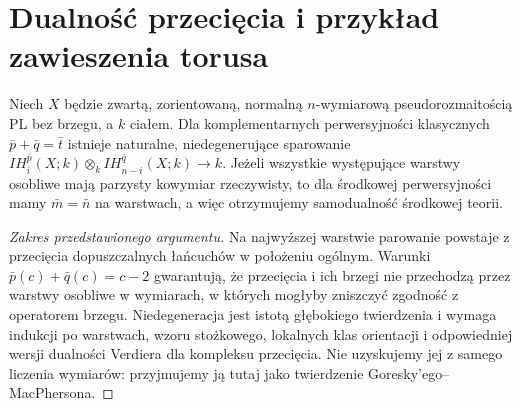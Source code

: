 \section{Dualność przecięcia i przykład zawieszenia torusa}
\begin{twierdzenie}
\label{thm:ih-duality-xiii}
Niech $X$ będzie zwartą, zorientowaną, normalną
$n$-wymiarową pseudorozmaitością PL bez brzegu,
a $k$ ciałem. Dla komplementarnych perwersyjności
klasycznych $\bar p+\bar q=\bar t$ istnieje
naturalne, niedegenerujące sparowanie
$IH_i^{\bar p}(X;k)\otimes_k
 IH_{n-i}^{\bar q}(X;k)\to k$.
Jeżeli wszystkie występujące warstwy osobliwe mają parzysty
kowymiar rzeczywisty, to dla środkowej
perwersyjności mamy $\bar m=\bar n$ na warstwach,
a więc otrzymujemy samodualność środkowej teorii.
\end{twierdzenie}
\begin{proof}[Zakres przedstawionego argumentu]
Na najwyższej warstwie parowanie powstaje z przecięcia
dopuszczalnych łańcuchów w położeniu ogólnym.
Warunki $\bar p(c)+\bar q(c)=c-2$ gwarantują,
że przecięcia i ich brzegi nie przechodzą przez
warstwy osobliwe w wymiarach, w których mogłyby
zniszczyć zgodność z operatorem brzegu.
Niedegeneracja jest istotą głębokiego twierdzenia
i wymaga indukcji po warstwach, wzoru stożkowego,
lokalnych klas orientacji i odpowiedniej wersji
dualności Verdiera dla kompleksu przecięcia.
Nie uzyskujemy jej z samego liczenia wymiarów:
przyjmujemy ją tutaj jako twierdzenie Goresky'ego--MacPhersona.
\end{proof}


